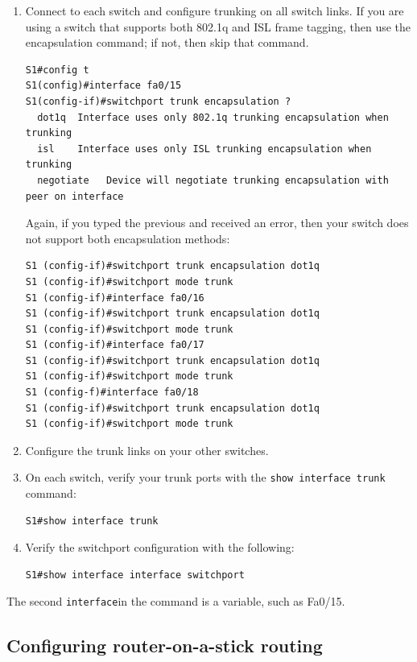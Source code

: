 \begin{enumerate}
\item
  Connect to each
  switch and configure trunking on all switch links. If you are using a
  switch that supports both 802.1q and ISL frame tagging, then use the
  encapsulation command; if not, then skip that command.

\begin{verbatim}
S1#config t
S1(config)#interface fa0/15
S1(config-if)#switchport trunk encapsulation ?
  dot1q  Interface uses only 802.1q trunking encapsulation when trunking
  isl    Interface uses only ISL trunking encapsulation when trunking
  negotiate   Device will negotiate trunking encapsulation with peer on interface
\end{verbatim}

  Again, if you typed the previous and received an error, then your
  switch does not support both encapsulation methods:

\begin{verbatim}
S1 (config-if)#switchport trunk encapsulation dot1q
S1 (config-if)#switchport mode trunk
S1 (config-if)#interface fa0/16
S1 (config-if)#switchport trunk encapsulation dot1q
S1 (config-if)#switchport mode trunk
S1 (config-if)#interface fa0/17
S1 (config-if)#switchport trunk encapsulation dot1q
S1 (config-if)#switchport mode trunk
S1 (config-f)#interface fa0/18
S1 (config-if)#switchport trunk encapsulation dot1q
S1 (config-if)#switchport mode trunk
\end{verbatim}
\item
  Configure the trunk links on your other switches.
\item
  On each switch, verify your trunk ports with the
  \texttt{show\ interface\ trunk} command:

\begin{verbatim}
S1#show interface trunk
\end{verbatim}
\item
  Verify the switchport configuration with the following:

\begin{verbatim}
S1#show interface interface switchport
\end{verbatim}
\end{enumerate}

The second \texttt{interface}in the command is a variable, such as
Fa0/15.

\subsection{Configuring router-on-a-stick routing}

